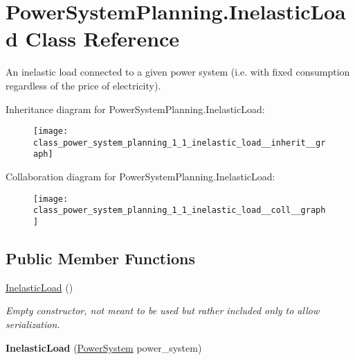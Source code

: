 \hypertarget{class_power_system_planning_1_1_inelastic_load}{}\section{Power\+System\+Planning.\+Inelastic\+Load Class Reference}
\label{class_power_system_planning_1_1_inelastic_load}


An inelastic load connected to a given power system (i.\+e. with fixed consumption regardless of the price of electricity).  




Inheritance diagram for Power\+System\+Planning.\+Inelastic\+Load\+:\nopagebreak
\begin{figure}[H]
\begin{center}
\leavevmode
\texttt{[image: class\_power\_system\_planning\_1\_1\_inelastic\_load\_\_inherit\_\_graph]}
\end{center}
\end{figure}


Collaboration diagram for Power\+System\+Planning.\+Inelastic\+Load\+:\nopagebreak
\begin{figure}[H]
\begin{center}
\leavevmode
\texttt{[image: class\_power\_system\_planning\_1\_1\_inelastic\_load\_\_coll\_\_graph]}
\end{center}
\end{figure}
\subsection*{Public Member Functions}
\begin{DoxyCompactItemize}
\item 
\hyperlink{class_power_system_planning_1_1_inelastic_load_a47abae64f9f66d537230cdff873d9efa}{Inelastic\+Load} ()
\begin{DoxyCompactList}\small\item\em Empty constructor, not meant to be used but rather included only to allow serialization. \end{DoxyCompactList}\item 
{\bfseries Inelastic\+Load} (\hyperlink{class_power_system_planning_1_1_power_system}{Power\+System} power\+\_\+system)\hypertarget{class_power_system_planning_1_1_inelastic_load_a8ff8d78ce9c7189100619c82f0038a61}{}\label{class_power_system_planning_1_1_inelastic_load_a8ff8d78ce9c7189100619c82f0038a61}

\end{DoxyCompactItemize}
